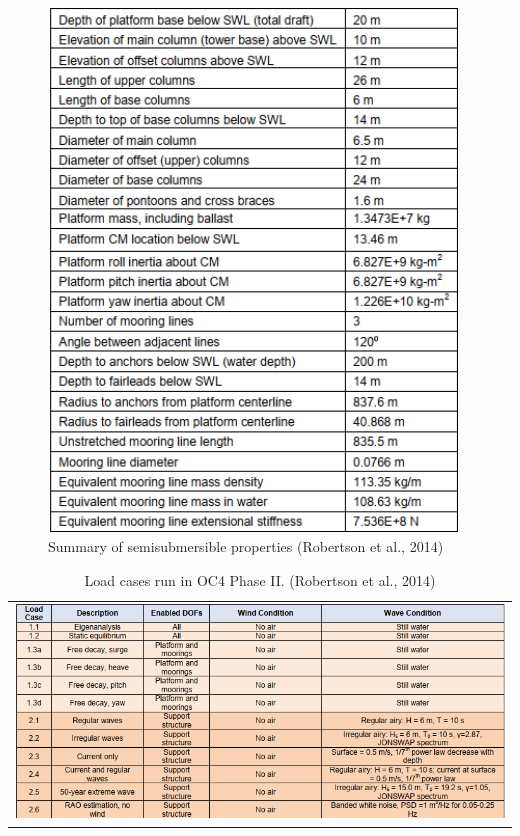 \documentclass[a4paper, 11pt]{article}
\begin{document}
\begin{figure}[H]
\begin{minipage}{0.47\textwidth}
        \label{fig:OC4}
    \end{minipage}
    \hfill
    \begin{minipage}{0.5\textwidth}
        \centering
        \includegraphics[width=0.97\textwidth]{characteristics.png}
        \caption{\small Summary of semisubmersible properties (Robertson et al., 2014)}
        \label{fig:characteristics}
    \end{minipage}
\end{figure}

\begin{table}[H]
    \centering
    \caption{Load cases run in OC4 Phase II. (Robertson et al., 2014)}
    \label{tab:image_table}
    \begin{tabular}{c}
        \includegraphics[width=1\textwidth]{table_3.png} \\
    \end{tabular}
\end{table}
\end{document}

